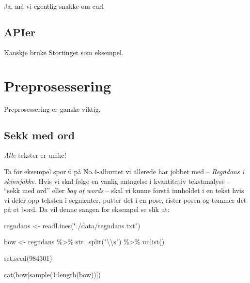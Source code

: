 \documentclass[
]{article}
\newenvironment{Shaded}{\begin{snugshade}}{\end{snugshade}}
\newcommand{\DecValTok}[1]{\textcolor[rgb]{0.00,0.00,0.81}{#1}}
\newcommand{\FunctionTok}[1]{\textcolor[rgb]{0.00,0.00,0.00}{#1}}
\newcommand{\NormalTok}[1]{#1}
\newcommand{\OtherTok}[1]{\textcolor[rgb]{0.56,0.35,0.01}{#1}}
\newcommand{\SpecialCharTok}[1]{\textcolor[rgb]{0.00,0.00,0.00}{#1}}
\newcommand{\StringTok}[1]{\textcolor[rgb]{0.31,0.60,0.02}{#1}}
\begin{document}
Ja, må vi egentlig snakke om curl

\hypertarget{apier}{%
\subsection{APIer}\label{apier}}

Kanskje bruke Stortinget som eksempel.

\hypertarget{prepros}{%
\section{Preprosessering}\label{prepros}}

Preprosessering er ganske viktig.

\hypertarget{sekk-med-ord}{%
\subsection{Sekk med ord}\label{sekk-med-ord}}

\emph{Alle} tekster er unike!

Ta for eksempel spor 6 på No.4-albumet vi allerede har jobbet med --
\emph{Regndans i skinnjakke}. Hvis vi skal følge en vanlig antagelse i
kvantitativ tekstanalyse -- ``sekk med ord'' eller \emph{bag of words}
-- skal vi kunne forstå innholdet i en tekst hvis vi deler opp teksten i
segmenter, putter det i en pose, rister posen og tømmer det på et bord.
Da vil denne sangen for eksempel se slik ut:

\begin{Shaded}
\begin{Highlighting}[]
\NormalTok{regndans }\OtherTok{\textless{}{-}} \FunctionTok{readLines}\NormalTok{(}\StringTok{"./data/regndans.txt"}\NormalTok{)}

\NormalTok{bow }\OtherTok{\textless{}{-}}\NormalTok{ regndans }\SpecialCharTok{\%\textgreater{}\%}
    \FunctionTok{str\_split}\NormalTok{(}\StringTok{"}\SpecialCharTok{\textbackslash{}\textbackslash{}}\StringTok{s"}\NormalTok{) }\SpecialCharTok{\%\textgreater{}\%}
    \FunctionTok{unlist}\NormalTok{()}

\FunctionTok{set.seed}\NormalTok{(}\DecValTok{984301}\NormalTok{)}

\FunctionTok{cat}\NormalTok{(bow[}\FunctionTok{sample}\NormalTok{(}\DecValTok{1}\SpecialCharTok{:}\FunctionTok{length}\NormalTok{(bow))])}
\end{Highlighting}
\end{Shaded}
\end{document}

